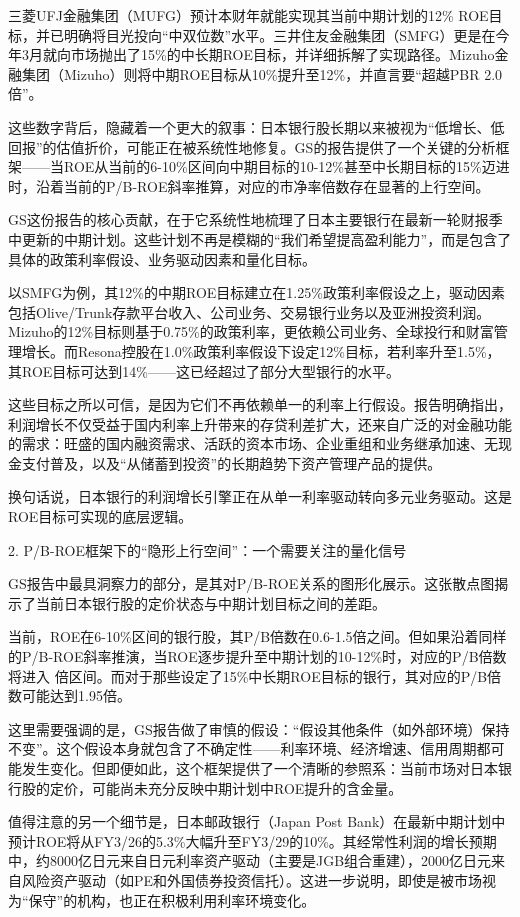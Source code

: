 \documentclass[11pt]{ctexart}
\begin{document}
三菱UFJ金融集团（MUFG）预计本财年就能实现其当前中期计划的12\% ROE目标，并已明确将目光投向“中双位数”水平。三井住友金融集团（SMFG）更是在今年3月就向市场抛出了15\%的中长期ROE目标，并详细拆解了实现路径。Mizuho金融集团（Mizuho）则将中期ROE目标从10\%提升至12\%，并直言要“超越PBR 2.0倍”。

这些数字背后，隐藏着一个更大的叙事：日本银行股长期以来被视为“低增长、低回报”的估值折价，可能正在被系统性地修复。GS的报告提供了一个关键的分析框架——当ROE从当前的6-10\%区间向中期目标的10-12\%甚至中长期目标的15\%迈进时，沿着当前的P/B-ROE斜率推算，对应的市净率倍数存在显著的上行空间。

GS这份报告的核心贡献，在于它系统性地梳理了日本主要银行在最新一轮财报季中更新的中期计划。这些计划不再是模糊的“我们希望提高盈利能力”，而是包含了具体的政策利率假设、业务驱动因素和量化目标。

以SMFG为例，其12\%的中期ROE目标建立在1.25\%政策利率假设之上，驱动因素包括Olive/Trunk存款平台收入、公司业务、交易银行业务以及亚洲投资利润。Mizuho的12\%目标则基于0.75\%的政策利率，更依赖公司业务、全球投行和财富管理增长。而Resona控股在1.0\%政策利率假设下设定12\%目标，若利率升至1.5\%，其ROE目标可达到14\%——这已经超过了部分大型银行的水平。

这些目标之所以可信，是因为它们不再依赖单一的利率上行假设。报告明确指出，利润增长不仅受益于国内利率上升带来的存贷利差扩大，还来自广泛的对金融功能的需求：旺盛的国内融资需求、活跃的资本市场、企业重组和业务继承加速、无现金支付普及，以及“从储蓄到投资”的长期趋势下资产管理产品的提供。

换句话说，日本银行的利润增长引擎正在从单一利率驱动转向多元业务驱动。这是ROE目标可实现的底层逻辑。

2. P/B-ROE框架下的“隐形上行空间”：一个需要关注的量化信号

GS报告中最具洞察力的部分，是其对P/B-ROE关系的图形化展示。这张散点图揭示了当前日本银行股的定价状态与中期计划目标之间的差距。

当前，ROE在6-10\%区间的银行股，其P/B倍数在0.6-1.5倍之间。但如果沿着同样的P/B-ROE斜率推演，当ROE逐步提升至中期计划的10-12\%时，对应的P/B倍数将进入 倍区间。而对于那些设定了15\%中长期ROE目标的银行，其对应的P/B倍数可能达到1.95倍。

这里需要强调的是，GS报告做了审慎的假设：“假设其他条件（如外部环境）保持不变”。这个假设本身就包含了不确定性——利率环境、经济增速、信用周期都可能发生变化。但即便如此，这个框架提供了一个清晰的参照系：当前市场对日本银行股的定价，可能尚未充分反映中期计划中ROE提升的含金量。

值得注意的另一个细节是，日本邮政银行（Japan Post Bank）在最新中期计划中预计ROE将从FY3/26的5.3\%大幅升至FY3/29的10\%。其经常性利润的增长预期中，约8000亿日元来自日元利率资产驱动（主要是JGB组合重建），2000亿日元来自风险资产驱动（如PE和外国债券投资信托）。这进一步说明，即使是被市场视为“保守”的机构，也正在积极利用利率环境变化。
\end{document}
